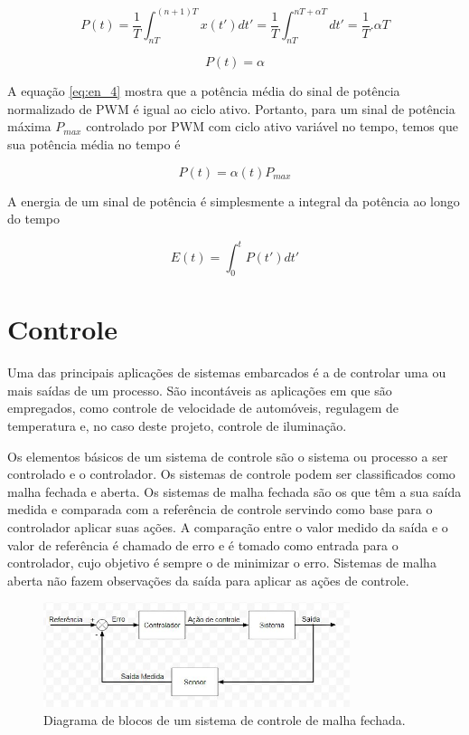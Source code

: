 \begin{equation}
    \label{eq:en_3}
    P(t) = \frac{1}{T} \int_{nT}^{(n+1)T}x(t')dt' = \frac{1}{T} \int_{nT}^{nT+\alpha T}dt' = \frac{1}{T}.\alpha T
\end{equation}

\begin{equation}
    \label{eq:en_4}
    P(t) = \alpha
\end{equation}

A equação \ref{eq:en_4} mostra que a potência média do sinal de potência normalizado de PWM é igual ao ciclo ativo. Portanto, para um sinal de potência máxima $P_{max}$ controlado por PWM com ciclo ativo variável no tempo, temos que sua potência média no tempo é

\begin{equation}
    \label{eq:en_5}
    P(t) = \alpha(t)P_{max}
\end{equation}

A energia de um sinal de potência é simplesmente a integral da potência ao longo do tempo

\begin{equation}
    \label{eq:en_6}
    E(t) = \int_{0}^{t}P(t')dt'
\end{equation}

\section{Controle}

Uma das principais aplicações de sistemas embarcados é a de controlar uma ou mais saídas de um processo. São incontáveis as aplicações em que são empregados, como controle de velocidade de automóveis, regulagem de temperatura e, no caso deste projeto, controle de iluminação. 

Os elementos básicos de um sistema de controle são o sistema ou processo a ser controlado e o controlador. Os sistemas de controle podem ser classificados como malha fechada e aberta. Os sistemas de malha fechada são os que têm a sua saída medida e comparada com a referência de controle servindo como base para o controlador aplicar suas ações. A comparação entre o valor medido da saída e o valor de referência é chamado de erro e é tomado como entrada para o controlador, cujo objetivo é sempre o de minimizar o erro. Sistemas de malha aberta não fazem observações da saída para aplicar as ações de controle.

\begin{figure}[ht]
    \begin{center}
    \includegraphics[width=0.8\textwidth]{figuras/malha.JPG}
    \end{center}
    \caption[Diagrama de blocos um sistema de controle de malha fechada.]{Diagrama de blocos de um sistema de controle de malha fechada.}
    \label{malha}
\end{figure}

